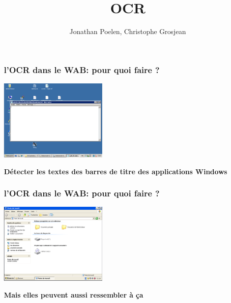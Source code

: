 \documentclass[xcolor=dvipsnames]{beamer}
\author{Jonathan Poelen, Christophe Grosjean}
\institute{Wallix}
\title{OCR}
\begin{document}
\begin{frame}[plain]
\titlepage
\end{frame}


\begin{frame}
\frametitle{l'OCR dans le WAB: pour quoi faire ?}
    \begin{center}
       \includegraphics[width=200px]{TBar2.png}
      \begin{alertblock}{}
            \begin{center}
                  \textbf{\Large Détecter les textes des barres de titre des applications Windows}
            \end{center}
      \end{alertblock}
    \end{center}
\end{frame}

\begin{frame}
\frametitle{l'OCR dans le WAB: pour quoi faire ?}
    \begin{center}
       \includegraphics[width=200px]{PosteDeTravail.png}
      \begin{alertblock}{}
            \begin{center}
                  \textbf{\Large Mais elles peuvent aussi ressembler à ça}
            \end{center}
      \end{alertblock}
    \end{center}
\end{frame}
\end{document}
